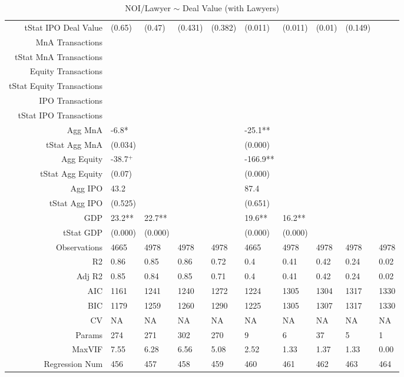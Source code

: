 \begin{table}[ht]
\begin{tabular}{rlllllllll}
  tStat IPO Deal Value & (0.65) & (0.47) & (0.431) & (0.382) & (0.011) & (0.011) & (0.01) & (0.149) &  \\ 
  MnA Transactions &  &  &  &  &  &  &  &  &  \\ 
  tStat MnA Transactions &  &  &  &  &  &  &  &  &  \\ 
  Equity Transactions &  &  &  &  &  &  &  &  &  \\ 
  tStat Equity Transactions &  &  &  &  &  &  &  &  &  \\ 
  IPO Transactions &  &  &  &  &  &  &  &  &  \\ 
  tStat IPO Transactions &  &  &  &  &  &  &  &  &  \\ 
  Agg MnA & -6.8* &  &  &  & -25.1** &  &  &  &  \\ 
  tStat Agg MnA & (0.034) &  &  &  & (0.000) &  &  &  &  \\ 
  Agg Equity & -38.7$^{+}$ &  &  &  & -166.9** &  &  &  &  \\ 
  tStat Agg Equity & (0.07) &  &  &  & (0.000) &  &  &  &  \\ 
  Agg IPO & 43.2 &  &  &  & 87.4 &  &  &  &  \\ 
  tStat Agg IPO & (0.525) &  &  &  & (0.651) &  &  &  &  \\ 
  GDP & 23.2** & 22.7** &  &  & 19.6** & 16.2** &  &  &  \\ 
  tStat GDP & (0.000) & (0.000) &  &  & (0.000) & (0.000) &  &  &  \\ 
  Observations & 4665 & 4978 & 4978 & 4978 & 4665 & 4978 & 4978 & 4978 & 4978 \\ 
  R2 & 0.86 & 0.85 & 0.86 & 0.72 & 0.4 & 0.41 & 0.42 & 0.24 & 0.02 \\ 
  Adj R2 & 0.85 & 0.84 & 0.85 & 0.71 & 0.4 & 0.41 & 0.42 & 0.24 & 0.02 \\ 
  AIC & 1161 & 1241 & 1240 & 1272 & 1224 & 1305 & 1304 & 1317 & 1330 \\ 
  BIC & 1179 & 1259 & 1260 & 1290 & 1225 & 1305 & 1307 & 1317 & 1330 \\ 
  CV & NA & NA & NA & NA & NA & NA & NA & NA & NA \\ 
  Params & 274 & 271 & 302 & 270 & 9 & 6 & 37 & 5 & 1 \\ 
  MaxVIF & 7.55 & 6.28 & 6.56 & 5.08 & 2.52 & 1.33 & 1.37 & 1.33 & 0.00 \\ 
  Regression Num & 456 & 457 & 458 & 459 & 460 & 461 & 462 & 463 & 464 \\ 
   \hline
\end{tabular}
\caption{NOI/Lawyer $\sim$ Deal Value (with Lawyers)} 
\end{table}
